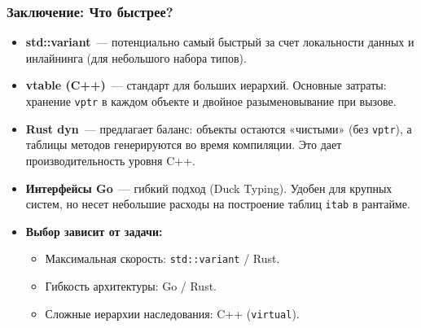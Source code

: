 \documentclass[10pt, aspectratio=169]{beamer}
\begin{document}
\begin{frame}
\frametitle{Заключение: Что быстрее?}
\begin{itemize}
    \item \textbf{std::variant}~--- потенциально самый быстрый за счет локальности данных и инлайнинга (для небольшого набора типов).
    
    \item \textbf{vtable (C++)}~--- стандарт для больших иерархий. Основные затраты: хранение \texttt{vptr} в каждом объекте и двойное разыменовывание при вызове.
    
    \item \textbf{Rust dyn}~--- предлагает баланс: объекты остаются «чистыми» (без \texttt{vptr}), а таблицы методов генерируются во время компиляции. Это дает производительность уровня C++.
    
    \item \textbf{Интерфейсы Go}~--- гибкий подход (Duck Typing). Удобен для крупных систем, но несет небольшие расходы на построение таблиц \texttt{itab} в рантайме.

    \item \textbf{Выбор зависит от задачи:} 
    \begin{itemize}
        \item Максимальная скорость: \texttt{std::variant} / Rust.
        \item Гибкость архитектуры: Go / Rust.
        \item Сложные иерархии наследования: C++ (\texttt{virtual}).
    \end{itemize}
\end{itemize}
\end{frame}
\end{document}
